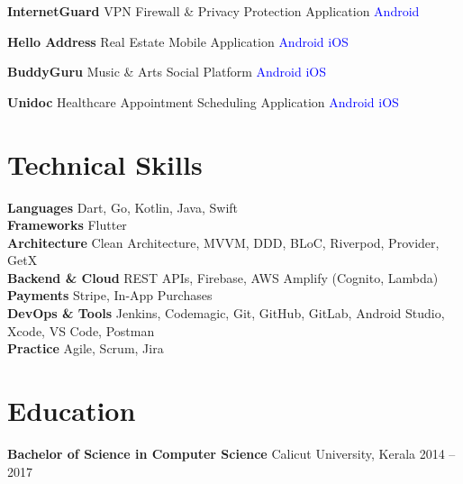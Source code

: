 \documentclass[letterpaper,10pt]{article}
\newcommand{\project}[2]{
  \noindent\textbf{#1} \hspace{2pt}\textemdash\hspace{2pt} #2
  \vspace{1pt}
}
\begin{document}
\project{InternetGuard}{VPN Firewall \& Privacy Protection Application \quad \textcolor{blue}{Android}}

\project{Hello Address}{Real Estate Mobile Application \quad \textcolor{blue}{Android} \quad \textcolor{blue}{iOS}}

\project{BuddyGuru}{Music \& Arts Social Platform \quad \textcolor{blue}{Android} \quad \textcolor{blue}{iOS}}

\project{Unidoc}{Healthcare Appointment Scheduling Application \quad \textcolor{blue}{Android} \quad \textcolor{blue}{iOS}}

\section*{Technical Skills}
\vspace{2pt}
\noindent
\textbf{Languages} \quad Dart, Go, Kotlin, Java, Swift \\
\textbf{Frameworks} \quad Flutter \\
\textbf{Architecture} \quad Clean Architecture, MVVM, DDD, BLoC, Riverpod, Provider, GetX \\
\textbf{Backend \& Cloud} \quad REST APIs, Firebase, AWS Amplify (Cognito, Lambda) \\
\textbf{Payments} \quad Stripe, In-App Purchases \\
\textbf{DevOps \& Tools} \quad Jenkins, Codemagic, Git, GitHub, GitLab, Android Studio, Xcode, VS Code, Postman \\
\textbf{Practice} \quad Agile, Scrum, Jira

\section*{Education}
\vspace{2pt}
\noindent\textbf{Bachelor of Science in Computer Science} \hspace{2pt}\textemdash\hspace{2pt} Calicut University, Kerala \hfill 2014 -- 2017
\end{document}
